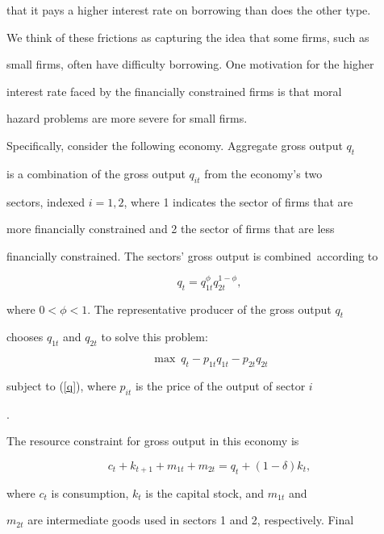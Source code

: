 \documentclass[fleqn,leqno,11pt]{article}
\begin{document}
that it pays a higher interest rate on borrowing than does the other type.

We think of these frictions as capturing the idea that some firms, such as

small firms, often have difficulty borrowing. One motivation for the higher

interest rate faced by the financially constrained firms is that moral

hazard problems are more severe for small firms.



Specifically, consider the following economy. Aggregate gross output $q_{t}$

is a combination of the gross output $q_{it}$ from the economy's two

sectors, indexed $i=1,2$, where 1 indicates the sector of firms that are

more financially constrained and 2 the sector of firms that are less

financially constrained. The sectors' gross output is combined\ according to 

\begin{equation}

q_{t}=q_{1t}^{\phi }q_{2t}^{1-\phi },  \label{q}

\end{equation}

where $0<\phi <1.$ The representative producer of the gross output $q_{t}$

chooses $q_{1t}$ and $q_{2t}$ to solve this problem: 

\[

\max \ q_{t}-p_{1t}q_{1t}-p_{2t}q_{2t} 

\]

subject to (\ref{q}), where $p_{it}$ is the price of the output of sector $i$%

.



The resource constraint for gross output in this economy is 

\begin{equation}

c_{t}+k_{t+1}+m_{1t}+m_{2t}=q_{t}+(1-\delta )k_{t},  \label{gross output}

\end{equation}

where $c_{t}$ is consumption, $k_{t}$ is the capital stock, and $m_{1t}$ and 

$m_{2t}$ are intermediate goods used in sectors 1 and 2, respectively. Final
\end{document}
